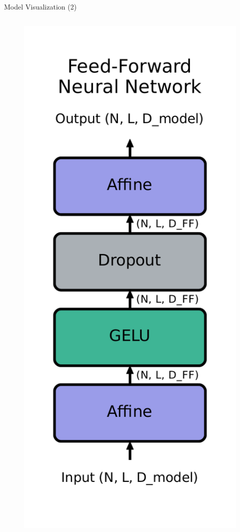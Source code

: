 \documentclass[10pt]{beamer}
\begin{document}
\begin{frame}[fragile]{Model Visualization (2)}
\begin{columns}
\begin{column}{0.3\textwidth}
\begin{figure}
    \includegraphics[width=\textwidth]{figures/model/ffnn.pdf}
\end{figure}    
\end{column}
\end{columns}
\end{frame}
\end{document}
